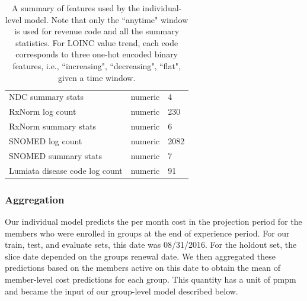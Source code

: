 \documentclass[letterpaper]{article} %
\begin{document}
\begin{table}[t]
\begin{tabular}{l l l}
NDC summary stats & numeric &4 \\
RxNorm log count & numeric & 230 \\
RxNorm summary stats & numeric & 6 \\
SNOMED log count & numeric & 2082 \\
SNOMED summary stats & numeric & 7 \\

Lumiata disease code log count & numeric & 91 \\  

 \hline
 \hline
\end{tabular}

\caption{A summary of features used by the individual-level model. Note that only the ``anytime" window is used for revenue code and all 
the summary statistics. For LOINC value trend, each code corresponds to three one-hot encoded binary features, i.e., ``increasing", ``decreasing", ``flat",  
given a time window.}
\label{tab:ind_feat}
\end{table}


\subsubsection{Aggregation}
Our individual model predicts the per month cost in the projection period for the members who were enrolled in groups at the end of experience period. For our train, test, and evaluate sets, this date was 08/31/2016. For the holdout set, the slice date depended on the groups renewal date. We then aggregated these predictions based on the members active on this date to obtain the mean of member-level cost predictions for each group. This quantity has a unit of pmpm and became the input of our group-level model described below.
\end{document}
